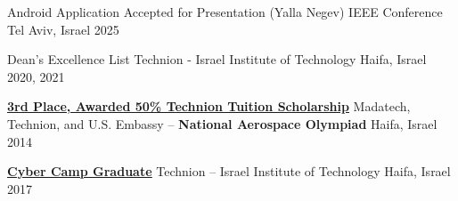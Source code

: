



\begin{cvhonors}

  \cvhonor
    {Android Application Accepted for Presentation (Yalla Negev)} %
    {IEEE Conference} %
    {Tel Aviv, Israel} %
    {2025} %

  \cvhonor
    {Dean's Excellence List} %
    {Technion - Israel Institute of Technology} %
    {Haifa, Israel} %
    {2020, 2021} %

  \cvhonor
    {\href{https://www.madatech.org.il/olimpiyeda-2014-final}{\underline{\textbf{3rd Place, Awarded 50\% Technion Tuition Scholarship}}}} %
    {Madatech, Technion, and U.S. Embassy – \textbf{National Aerospace Olympiad}} %
    {Haifa, Israel} %
    {2014} %

  \cvhonor
    {\href{https://cont-edu.technion.ac.il/programs/cyber/cyber-camp-2/}{\underline{\textbf{Cyber Camp Graduate}}}} %
    {Technion – Israel Institute of Technology} %
    {Haifa, Israel} %
    {2017} %


\end{cvhonors}